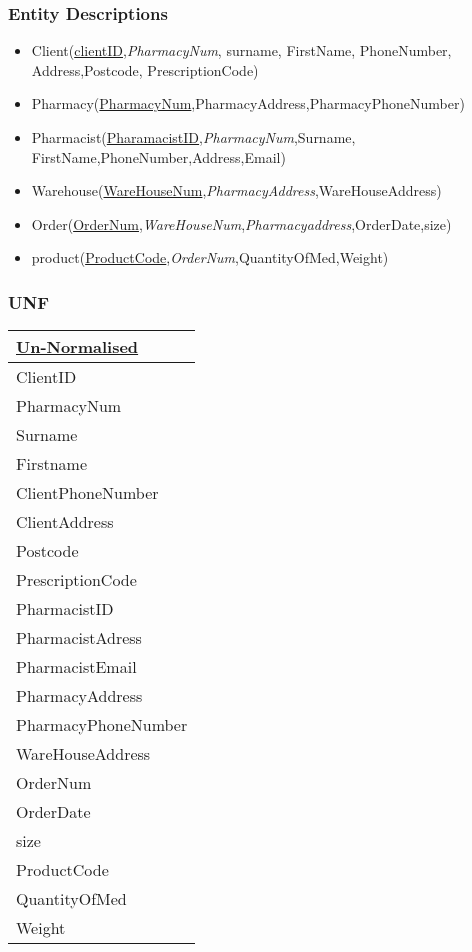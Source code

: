 \subsubsection{Entity Descriptions}
\begin{itemize}
\item Client(\underline{clientID},\emph{PharmacyNum}, surname, FirstName, PhoneNumber, Address,Postcode, PrescriptionCode)
\item Pharmacy(\underline{PharmacyNum},PharmacyAddress,PharmacyPhoneNumber)
\item Pharmacist(\underline{PharamacistID},\emph{PharmacyNum},Surname,
FirstName,PhoneNumber,Address,Email)
\item Warehouse(\underline{WareHouseNum},\emph{PharmacyAddress},WareHouseAddress)
\item Order(\underline{OrderNum},\emph{WareHouseNum},\emph{Pharmacyaddress},OrderDate,size)
\item product(\underline{ProductCode},\emph{OrderNum},QuantityOfMed,Weight)

\end{itemize}
\subsubsection{UNF}
\begin{table}[H]
\begin{tabular}{|l|}
\hline
\underline{Un-Normalised}\\
\hline
ClientID           \\
PharmacyNum        \\
Surname            \\
Firstname          \\
ClientPhoneNumber  \\
ClientAddress      \\
Postcode           \\
PrescriptionCode   \\
PharmacistID       \\
PharmacistAdress   \\
PharmacistEmail    \\
PharmacyAddress    \\
PharmacyPhoneNumber\\
WareHouseAddress   \\
OrderNum           \\
OrderDate          \\
size               \\
ProductCode        \\
QuantityOfMed      \\
Weight             \\
\hline
\end{tabular}
\end{table}

